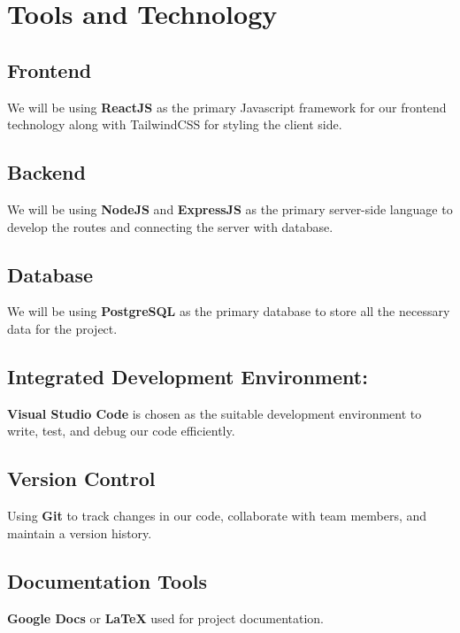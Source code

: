 \documentclass[11.5pt]{article}
\begin{document}
	
	\section{Tools and Technology}
	
	
	\subsection{Frontend}
	We will be using \textbf{ReactJS} as the primary Javascript framework for our frontend technology along with TailwindCSS for styling the client side.
	
	\subsection{Backend}
	We will be using \textbf{NodeJS} and \textbf{ExpressJS} as the primary server-side language to develop the routes and connecting the server with database.
	
	\subsection{Database}
	We will be using \textbf{PostgreSQL} as the primary database to store all the necessary data for the project.
	
	\subsection{Integrated Development Environment:}
	\textbf{Visual Studio Code} is chosen as the suitable development environment to write, test, and debug our code efficiently.
	
	\subsection{Version Control}
	Using \textbf{Git} to track changes in our code, collaborate with team members, and maintain a version history.
	
	\subsection{Documentation Tools}
	\textbf{Google Docs} or \textbf {LaTeX}  used for project documentation.
	
	
\end{document}
